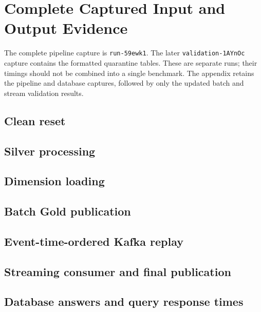 \documentclass[11pt,letterpaper]{article}
\newcommand{\reportdir}{.}
\newcommand{\reportdir}{documentation}
\newcommand{\captureroot}{\reportdir/evidence/run-59ewk1}
\begin{document}
\clearpage
\appendix
\section{Complete Captured Input and Output Evidence}\label{app:evidence}
The complete pipeline capture is \texttt{run-59ewk1}. The later
\texttt{validation-1AYnOc} capture contains the formatted quarantine tables.
These are separate runs; their timings should not be combined into a single
benchmark. The appendix retains the pipeline and database captures, followed
by only the updated batch and stream validation results.

\subsection{Clean reset}\label{app:clean}


\subsection{Silver processing}\label{app:silver}


\subsection{Dimension loading}\label{app:dimensions}


\subsection{Batch Gold publication}\label{app:gold}


\subsection{Event-time-ordered Kafka replay}\label{app:producer}


\subsection{Streaming consumer and final publication}\label{app:consumer}


\subsection{Database answers and query response times}\label{app:answers}

\end{document}
